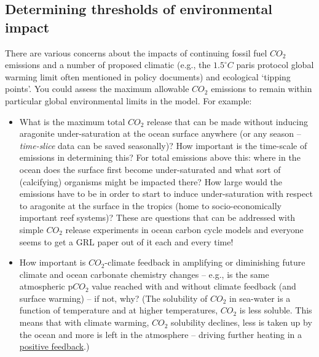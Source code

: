 
\subsection{Determining thresholds of environmental impact}

There are various concerns about the impacts of continuing fossil fuel \(CO_{2}\) emissions and a number of proposed climatic (e.g., the \(1.5^{\circ} C \) paris protocol global warming limit often mentioned in policy documents) and ecological ‘tipping points’. You could assess the maximum allowable \(CO_{2}\) emissions to remain within particular global environmental limits in the model. For example:

\begin{itemize}[noitemsep]

\vspace{1mm}
\item What is the maximum total \(CO_{2}\) release that can be made without inducing aragonite under-saturation at the ocean surface anywhere (or any season -- \textit{time-slice} data can be saved seasonally)? How important is the time-scale of emissions in determining this? For total emissions above this: where in the ocean does the surface first become under-saturated and what sort of (calcifying) organisms might be impacted there? How large would the emissions have to be in order to start to induce under-saturation with respect to aragonite at the surface in the tropics (home to socio-economically important reef systems)? These are questions that can be addressed with simple \(CO_{2}\) release experiments in ocean carbon cycle models and everyone seems to get a GRL paper out of it each and every time!

\newpage

\vspace{1mm}
\item How important is \(CO_{2}\)-climate feedback in amplifying or diminishing future climate and ocean carbonate chemistry changes – e.g., is the same atmospheric p\(CO_{2}\) value reached with and without climate feedback (and surface warming) – if not, why? (The solubility of \(CO_{2}\) in sea-water is a function of temperature and at higher temperatures, \(CO_{2}\) is less soluble. This means that with climate warming, \(CO_{2}\) solubility declines, less is taken up by the ocean and more is left in the atmosphere -- driving further heating in a \uline{positive feedback}.)


\end{itemize}

